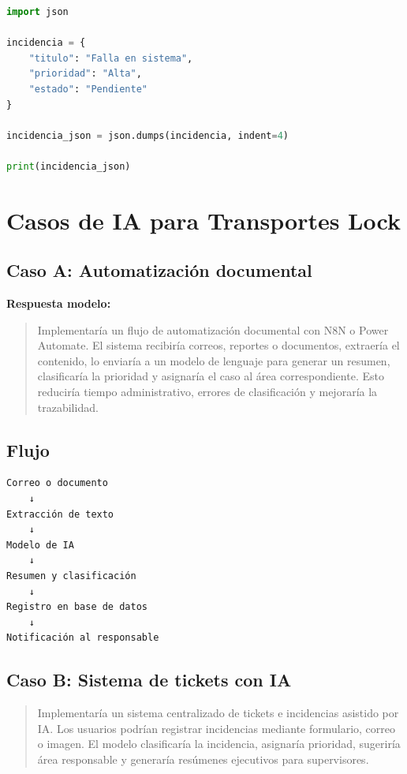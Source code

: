 \documentclass[12pt]{article}
\begin{document}
\begin{lstlisting}[language=Python]
import json

incidencia = {
    "titulo": "Falla en sistema",
    "prioridad": "Alta",
    "estado": "Pendiente"
}

incidencia_json = json.dumps(incidencia, indent=4)

print(incidencia_json)
\end{lstlisting}

\section{Casos de IA para Transportes Lock}

\subsection{Caso A: Automatización documental}

\textbf{Respuesta modelo:}

\begin{quote}
Implementaría un flujo de automatización documental con N8N o Power Automate. El sistema recibiría correos, reportes o documentos, extraería el contenido, lo enviaría a un modelo de lenguaje para generar un resumen, clasificaría la prioridad y asignaría el caso al área correspondiente. Esto reduciría tiempo administrativo, errores de clasificación y mejoraría la trazabilidad.
\end{quote}

\subsection{Flujo}

\begin{lstlisting}
Correo o documento
    ↓
Extracción de texto
    ↓
Modelo de IA
    ↓
Resumen y clasificación
    ↓
Registro en base de datos
    ↓
Notificación al responsable
\end{lstlisting}

\subsection{Caso B: Sistema de tickets con IA}

\begin{quote}
Implementaría un sistema centralizado de tickets e incidencias asistido por IA. Los usuarios podrían registrar incidencias mediante formulario, correo o imagen. El modelo clasificaría la incidencia, asignaría prioridad, sugeriría área responsable y generaría resúmenes ejecutivos para supervisores.
\end{quote}
\end{document}
